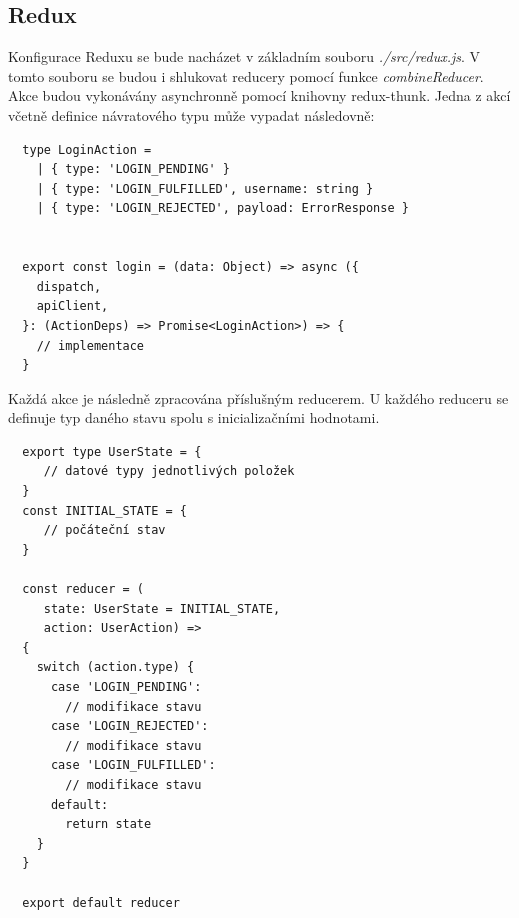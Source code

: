 \documentclass[thesis=M,czech]{FITthesis}[2018/10/20]
\begin{document}
\subsection{Redux}
Konfigurace Reduxu se bude nacházet v základním souboru \textit{./src/redux.js}. V tomto souboru se budou i shlukovat reducery pomocí funkce \textit{combineReducer}. Akce budou vykonávány asynchronně pomocí knihovny redux-thunk. Jedna z akcí včetně definice návratového typu může vypadat následovně:
\begin{lstlisting}
  type LoginAction =
    | { type: 'LOGIN_PENDING' }
    | { type: 'LOGIN_FULFILLED', username: string }
    | { type: 'LOGIN_REJECTED', payload: ErrorResponse }
  

  export const login = (data: Object) => async ({
    dispatch,
    apiClient,
  }: (ActionDeps) => Promise<LoginAction>) => {
	// implementace  
  }
\end{lstlisting}
\newpage
Každá akce je následně zpracována příslušným reducerem. U každého reduceru se definuje typ daného stavu spolu s inicializačními hodnotami.
\begin{lstlisting}
  export type UserState = {
     // datové typy jednotlivých položek
  }
  const INITIAL_STATE = {
     // počáteční stav  
  }
  
  const reducer = (
     state: UserState = INITIAL_STATE,
     action: UserAction) => 
  {
    switch (action.type) {
      case 'LOGIN_PENDING':
      	// modifikace stavu
      case 'LOGIN_REJECTED':
        // modifikace stavu
      case 'LOGIN_FULFILLED':
        // modifikace stavu
      default:
        return state
    }
  }
  
  export default reducer

\end{lstlisting}
\newpage
\end{document}

